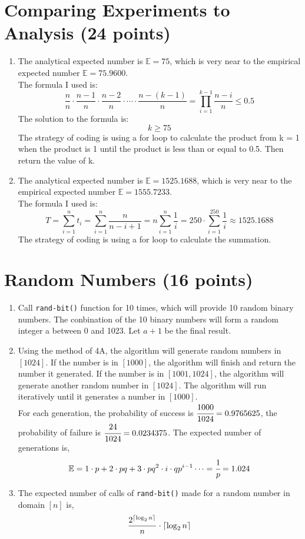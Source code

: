 \documentclass[11pt]{article}
\DeclarePairedDelimiter{\ceil}{\lceil}{\rceil}
\begin{document}
\section{Comparing Experiments to Analysis (24 points)}

\begin{enumerate}[A]
\item The analytical expected number is $\mathbb{E}=75$, which is very near to the empirical expected number $\mathbb{E} = 75.9600$.\\
The formula I used is:
\[
\frac{n}{n} \cdot \frac{n-1}{n} \cdot \frac{n-2}{n} \cdot \cdots \cdot \frac{n-(k-1)}{n} = \prod_{i=1}^{k-1}\frac{n-i}{n} \leq 0.5
\]
The solution to the formula is:
\[
k \geq 75
\]
The strategy of coding is using a for loop to calculate the product from k = 1 when the product is 1 until the product is less than or equal to 0.5. Then return the value of k.

\item The analytical expected number is $\mathbb{E}=1525.1688$, which is very near to the empirical expected number $\mathbb{E} = 1555.7233$.\\
The formula I used is:
\[
T=\sum_{i=1}^nt_i=\sum_{i=1}^n\frac{n}{n-i+1}=n\sum_{i=1}^n\frac{1}{i}=250\cdot\sum_{i=1}^{250}\frac{1}{i}\approx1525.1688
\]
The strategy of coding is using a for loop to calculate the summation.
\end{enumerate}

\section{Random Numbers (16 points)}
\begin{enumerate}[A]
\item Call \texttt{rand-bit()} function for 10 times, which will provide 10 random binary numbers. The conbination of the 10 binary numbers will form a random integer a between 0 and 1023. Let $a+1$ be the final result.
\item Using the method of 4A, the algorithm will generate random numbers in $[1024]$. If the number is in $[1000]$, the algorithm will finish and return the number it generated. If the number is in $[1001, 1024]$, the algorithm will generate another random number in $[1024]$. The algorithm will run iteratively until it generates a number in $[1000]$.\\
For each generation, the probability of success is $\cfrac{1000}{1024}=0.9765625$, the probability of failure is $\cfrac{24}{1024}=0.0234375$. The expected number of generations is,
\[\mathbb{E} = 1\cdot p+2\cdot pq+3\cdot pq^2 \cdot i\cdot qp^{i-1}\cdots=\cfrac{1}{p}=1.024
\]
\item The expected number of calls of \texttt{rand-bit()} made for a random number in domain $[n]$ is, 
\[\frac{2^{\ceil{\log_2n}}}{n}\cdot \ceil{\log_2n}\]
\end{enumerate}
\end{document}

